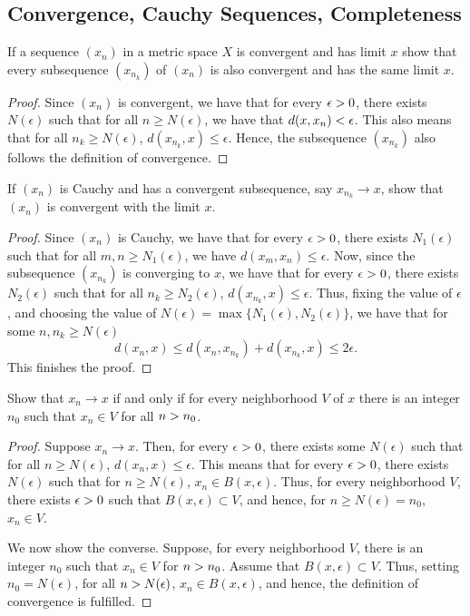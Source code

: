 \subsection{Convergence, Cauchy Sequences, Completeness}

\begin{question}
    If a sequence $(x_n)$ in a metric space $X$ is convergent and has limit $x$ show that every subsequence $(x_{n_k})$ of $(x_n)$ is also convergent and has the same limit $x$.
    \label{section1.4-1}
\end{question}
\begin{proof}
    Since $(x_n)$ is convergent, we have that for every $\epsilon > 0$, there exists $N(\epsilon)$ such that for all $n \geq N(\epsilon)$, we have that $d(x,x_n) < \epsilon$. This also means that for all $n_k \geq N(\epsilon)$, $d(x_{n_k} , x) \leq \epsilon$. Hence, the subsequence $(x_{n_k})$ also follows the definition of convergence.
\end{proof}

\begin{question}
    If $(x_n)$ is Cauchy and has a convergent subsequence, say $x_{n_k}\rightarrow x$, show that $(x_n)$ is convergent with the limit $x$.
    \label{section1.4-2}
\end{question}
\begin{proof}
    Since $(x_n)$ is Cauchy, we have that for every $\epsilon > 0$, there exists $N_1(\epsilon)$ such that for all $m , n \geq N_1(\epsilon)$, we have $d(x_m , x_n) \leq \epsilon.$ Now, since the subsequence $(x_{n_k})$ is converging to $x$, we have that for every $\epsilon > 0$, there exists $N_2(\epsilon)$ such that for all $n_k \geq N_2(\epsilon)$, $d(x_{n_k} , x) \leq \epsilon $. Thus, fixing the value of $\epsilon$, and choosing the value of $N(\epsilon) = \max\{N_1(\epsilon) , N_2(\epsilon)\}$, we have that for some $n, n_k \geq N(\epsilon)$
    \[d(x_n , x) \leq d(x_n , x_{n_k}) + d(x_{n_k} , x) \leq 2\epsilon. \]
    This finishes the proof.
\end{proof}

\begin{question}
    Show that $x_n \rightarrow x$ if and only if for every neighborhood $V$ of $x$ there is an integer $n_0$ such that $x_n \in V$ for all $n > n_0$.
    \label{section1.4-3}
\end{question}
\begin{proof}
    Suppose $x_n \rightarrow x$. Then, for every $\epsilon > 0$, there exists some $N(\epsilon)$ such that for all $n \geq N(\epsilon)$, $d(x_n , x) \leq \epsilon$. This means that for every $\epsilon > 0$, there exists $N(\epsilon)$ such that for $n \geq N(\epsilon)$, $x_n \in B(x , \epsilon)$. Thus, for every neighborhood $V$, there exists $\epsilon > 0$ such that $B(x , \epsilon) \subset V$, and hence, for $n \geq N(\epsilon) = n_0$, $x_n \in V$. 

    We now show the converse. Suppose, for every neighborhood $V$, there is an integer $n_0$ such that $x_n \in V$ for $n > n_0$. Assume that $B(x , \epsilon) \subset V$. Thus, setting $n_0 = N(\epsilon)$, for all $n > N(\epsilon)$, $x_n \in B(x , \epsilon)$, and hence, the definition of convergence is fulfilled.
\end{proof}

